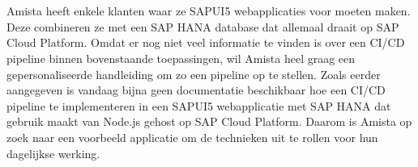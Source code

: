 %

\section{}
\label{sec:probleemstelling}

Amista heeft enkele klanten waar ze SAPUI5 webapplicaties voor moeten maken. Deze combineren ze met een SAP HANA database dat allemaal draait op SAP Cloud Platform. Omdat er nog niet veel informatie te vinden is over een CI/CD pipeline binnen bovenstaande toepassingen, wil Amista heel graag een gepersonaliseerde handleiding om zo een pipeline op te stellen.
Zoals eerder aangegeven is vandaag bijna geen documentatie beschikbaar hoe een CI/CD pipeline te implementeren in een SAPUI5 webapplicatie met SAP HANA dat gebruik maakt van Node.js gehost op SAP Cloud Platform. 
Daarom is Amista op zoek naar een voorbeeld applicatie om de technieken uit te rollen voor hun dagelijkse werking.

